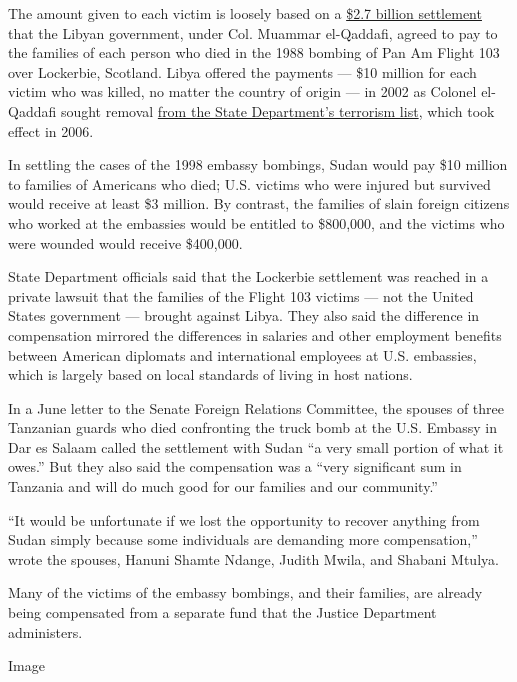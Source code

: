 The amount given to each victim is loosely based on a
\href{https://archive.vn/20120707022256/http:/articles.cnn.com/2002-05-28/us/libya.lockerbie.settlement_1_libyan-offer-commercial-sanctions-families-of-terror-victims}{\$2.7
billion settlement} that the Libyan government, under Col. Muammar
el-Qaddafi, agreed to pay to the families of each person who died in the
1988 bombing of Pan Am Flight 103 over Lockerbie, Scotland. Libya
offered the payments --- \$10 million for each victim who was killed, no
matter the country of origin --- in 2002 as Colonel el-Qaddafi sought
removal
\href{https://abcnews.go.com/International/story?id=1965753\&page=1}{from
the State Department's terrorism list}, which took effect in 2006.

In settling the cases of the 1998 embassy bombings, Sudan would pay \$10
million to families of Americans who died; U.S. victims who were injured
but survived would receive at least \$3 million. By contrast, the
families of slain foreign citizens who worked at the embassies would be
entitled to \$800,000, and the victims who were wounded would receive
\$400,000.

State Department officials said that the Lockerbie settlement was
reached in a private lawsuit that the families of the Flight 103 victims
--- not the United States government --- brought against Libya. They
also said the difference in compensation mirrored the differences in
salaries and other employment benefits between American diplomats and
international employees at U.S. embassies, which is largely based on
local standards of living in host nations.

In a June letter to the Senate Foreign Relations Committee, the spouses
of three Tanzanian guards who died confronting the truck bomb at the
U.S. Embassy in Dar es Salaam called the settlement with Sudan ``a very
small portion of what it owes.'' But they also said the compensation was
a ``very significant sum in Tanzania and will do much good for our
families and our community.''

``It would be unfortunate if we lost the opportunity to recover anything
from Sudan simply because some individuals are demanding more
compensation,'' wrote the spouses, Hanuni Shamte Ndange, Judith Mwila,
and Shabani Mtulya.

Many of the victims of the embassy bombings, and their families, are
already being compensated from a separate fund that the Justice
Department administers.

Image

